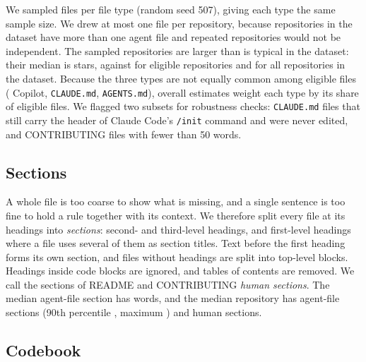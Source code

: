 \documentclass[sigconf,nonacm]{acmart}
\begin{document}


We sampled \nPerAgent{} files per file type (random seed 507), giving each type the same sample
size. We drew at most one file per repository, because \nMultiAgentRepos{} repositories in the
dataset have more than one agent file and repeated repositories would not be independent. The
sampled repositories are larger than is typical in the dataset: their median is
\sampleMedianStars{} stars, against \eligibleMedianStars{} for eligible repositories and
\datasetMedianStars{} for all repositories in the dataset. Because the three types are not equally
common among eligible files (\nEligibleCopilot{} Copilot, \nEligibleClaude{} \texttt{CLAUDE.md},
\nEligibleAgents{} \texttt{AGENTS.md}), overall estimates weight each type by its share of eligible
files. We flagged two subsets for robustness checks: \nInitUnedited{} \texttt{CLAUDE.md} files that
still carry the header of Claude Code's \texttt{/init} command and were never edited, and
\nStubContributing{} CONTRIBUTING files with fewer than 50 words.

\subsection{Sections}\label{sec:sections}

A whole file is too coarse to show what is missing, and a single sentence is too fine to hold a rule
together with its context. We therefore split every file at its headings into \emph{sections}:
second- and third-level headings, and first-level headings where a file uses several of them as
section titles. Text before the first heading forms its own section, and files without headings are
split into top-level blocks. Headings inside code blocks are ignored, and tables of contents are
removed. We call the sections of README and CONTRIBUTING \emph{human sections}. The
median agent-file section has \agentUnitMedianWords{} words, and the median repository has
\agentUnitsPerRepoMedian{} agent-file sections (90th percentile \agentUnitsPerRepoNinety, maximum
\agentUnitsPerRepoMax) and \humanSectionsPerRepoMedian{} human sections.

\subsection{Codebook}\label{sec:codebook}
\end{document}

